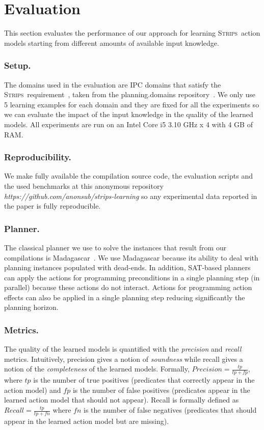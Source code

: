 \documentclass{article}
\newcommand{\strips}{\textsc{Strips}}     %
\begin{document}
\section{Evaluation}
This section evaluates the performance of our approach for learning \strips\ action models starting from different amounts of available input knowledge.

\subsubsection{Setup.}
The domains used in the evaluation are IPC domains that satisfy the \strips\ requirement~\cite{fox2003pddl2}, taken from the {\sc planning.domains} repository~\cite{muise2016planning}. We only use 5 learning examples for each domain and they are fixed for all the experiments so we can evaluate the impact of the input knowledge in the quality of the learned models. All experiments are run on an Intel Core i5 3.10 GHz x 4 with 4 GB of RAM.

\subsubsection{Reproducibility.}
We make fully available the compilation source code, the evaluation scripts and the used benchmarks at this anonymous repository {\em https://github.com/anonsub/strips-learning} so any experimental data reported in the paper is fully reproducible. 

\subsubsection{Planner.}
The classical planner we use to solve the instances that result from our compilations is {\sc Madagascar}~\cite{rintanen2014madagascar}. We use {\sc Madagascar} because its ability to deal with planning instances populated with dead-ends. In addition, SAT-based planners can apply the actions for programming preconditions in a single planning step (in parallel) because these actions do not interact. Actions for programming action effects can also be applied in a single planning step reducing significantly the planning horizon.

\subsubsection{Metrics.}
The quality of the learned models is quantified with the {\em precision} and {\em recall} metrics. Intuitively, precision gives a notion of {\em soundness} while recall gives a notion of the {\em completeness} of the learned models. Formally, $Precision=\frac{tp}{tp+fp}$, where $tp$ is the number of true positives (predicates that correctly appear in the action model) and $fp$ is the number of false positives (predicates appear in the learned action model that should not appear). Recall is formally defined as $Recall=\frac{tp}{tp+fn}$ where $fn$ is the number of false negatives (predicates that should appear in the learned action model but are missing).
\end{document}
